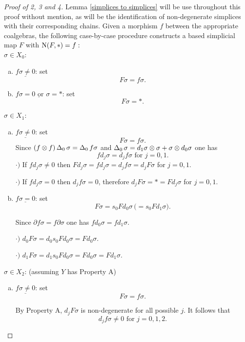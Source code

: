 \documentclass[thesis.tex]{subfiles}
\begin{document}
\begin{proof}[Proof of 2, 3 and 4]
Lemma \ref{simplices to simplices} will be use throughout this proof without mention, as will be the identification of non-degenerate simplices with their corresponding chains. Given a morphism $f$ between the appropriate coalgebras, the following case-by-case procedure constructs a based simplicial map $F$ with $\operatorname{N}(F,\ast)=f:$ \hfill \vspace*{5pt}\\
$\sigma\in X_0$:
    \begin{enumerate}[a)]
    \item $\underline{f\sigma\neq0}$: set $$F\sigma=f\sigma.$$
    \item $\underline{f\sigma=0 \text{ or } \sigma=\ast}$: set $$F\sigma=\ast.$$
    \end{enumerate}
$\sigma\in X_1$:
    \begin{enumerate}[a)]
    \item $\underline{f\sigma\neq0}$: set $$F\sigma=f\sigma.$$
    Since $(f\otimes f)\operatorname{\Delta}_0\sigma=\operatorname{\Delta}_0f\sigma$ and $\operatorname{\Delta}_0\sigma = d_1\sigma\otimes \sigma+\sigma\otimes d_0\sigma$ one has
    $$fd_j\sigma=d_jf\sigma\text{ for }j=0,1.$$
    $\cdot)$ If $fd_j\sigma\neq0$ then $Fd_j\sigma=fd_j\sigma=d_jf\sigma=d_jF\sigma$ for $j=0,1$.\par

    $\cdot)$ If $fd_j\sigma=0$ then $d_jf\sigma=0$, therefore $d_jF\sigma=\ast=Fd_j\sigma$ for $j=0,1$.\par

    \item $\underline{f\sigma=0}$: set $$F\sigma=s_0Fd_0\sigma \, \big(=s_0Fd_1\sigma\big).$$

        Since $\partial f\sigma = f\partial\sigma$ one has $fd_0\sigma = fd_1\sigma$.\par

        $\cdot)$ $d_0F\sigma=d_0s_0Fd_0\sigma=Fd_0\sigma$.\par

        $\cdot)$ $d_1F\sigma=d_1s_0Fd_0\sigma=Fd_0\sigma=Fd_1\sigma$.
    \end{enumerate}
$\sigma\in X_2$: (assuming $Y$ has Property A) \par
    \begin{enumerate}[a)]
    \item $\underline{f\sigma\neq0}$: set $$F\sigma=f\sigma.$$

    By Property A, $d_jF\sigma$ is non-degenerate for all possible $j$. It follows that $$d_jf\sigma\neq0\text{ for }j=0,1,2.$$


\end{enumerate}
\end{proof}
\end{document}

